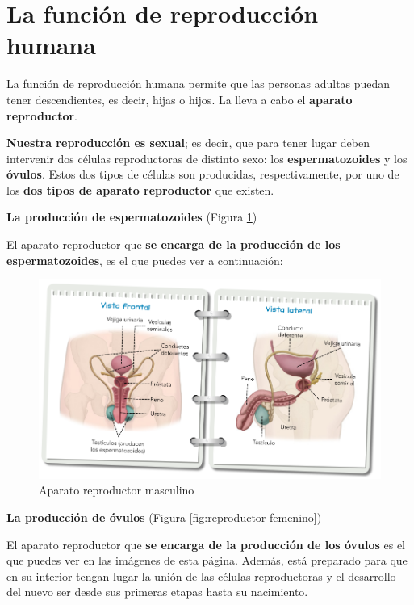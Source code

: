 \section{La función de reproducción humana}

La función de reproducción humana permite que las personas adultas puedan tener descendientes, es decir, hijas o hijos. La lleva a cabo el \textbf{aparato reproductor}.

\vspace{3mm}
\textbf{Nuestra reproducción es sexual}; es decir, que para tener lugar deben intervenir dos células reproductoras de distinto sexo: los \textbf{espermatozoides} y los \textbf{óvulos}. Estos dos tipos de células son producidas, respectivamente, por uno de los \textbf{dos tipos de aparato reproductor} que existen.

\vspace{3mm}
\textbf{La producción de espermatozoides} (Figura \ref{fig:reproductor-masculino})

\vspace{3mm}
El aparato reproductor que \textbf{se encarga de la producción de los espermatozoides}, es el que puedes ver a continuación:

\begin{figure}[!ht]
    \centering
    \includegraphics[width=0.7\linewidth]{Tema3/15_Aparato_reproductor_masculino.png}
    \caption{Aparato reproductor masculino}
    \label{fig:reproductor-masculino}
\end{figure}

\textbf{La producción de óvulos} (Figura \ref{fig:reproductor-femenino})

\vspace{3mm}
El aparato reproductor que \textbf{se encarga de la producción de los óvulos} es el que puedes ver en las imágenes de esta página. Además, está preparado para que en su interior tengan lugar la unión de las células reproductoras y el desarrollo del nuevo ser desde sus primeras etapas hasta su nacimiento.

